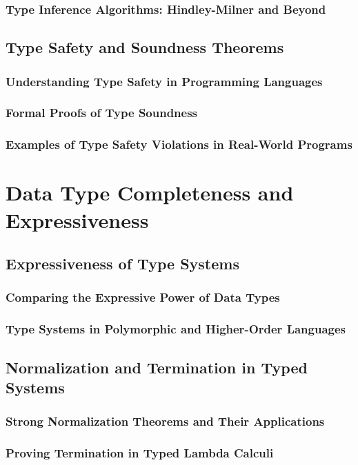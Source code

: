 \documentclass[12pt, oneside]{book}
\begin{document}
\subsubsection{Type Inference Algorithms: Hindley-Milner and Beyond}
\subsection{Type Safety and Soundness Theorems}
\subsubsection{Understanding Type Safety in Programming Languages}
\subsubsection{Formal Proofs of Type Soundness}
\subsubsection{Examples of Type Safety Violations in Real-World Programs}

\section{Data Type Completeness and Expressiveness}
\subsection{Expressiveness of Type Systems}
\subsubsection{Comparing the Expressive Power of Data Types}
\subsubsection{Type Systems in Polymorphic and Higher-Order Languages}
\subsection{Normalization and Termination in Typed Systems}
\subsubsection{Strong Normalization Theorems and Their Applications}
\subsubsection{Proving Termination in Typed Lambda Calculi}
\end{document}
